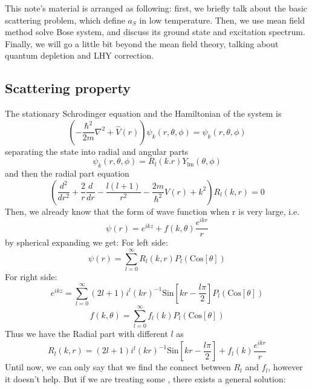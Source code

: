 This note's material is arranged as following: first, we briefly talk about the basic scattering problem, which define $a_S$ in low temperature.
Then, we use mean field method solve Bose system, and discuss its ground state and excitation spectrum. Finally, we will go a little bit beyond the mean field theory, talking about quantum depletion and LHY correction.

\subsection{Scattering property}
The stationary Schrodinger equation and the Hamiltonian of the system is
\begin{equation}
\left(-\frac{\hbar ^2}{2m}\nabla ^2+\hat{V}(r)\right)\psi _k(r,\theta ,\phi )=\psi _k(r,\theta ,\phi )
\end{equation}
separating the state into radial and angular parts
\begin{equation}
\psi _k(r,\theta ,\phi )=R_l(k.r)Y_{\text{lm}}(\theta,\phi)
\end{equation}
and then the radial part equation
\begin{equation}
\left(\frac{d^2}{dr^2}+\frac{2}{r}\frac{d}{dr}-\frac{l(l+1)}{r^2}-\frac{2m}{\hbar ^2}V(r)+k^2\right)R_l(k,r)=0
\end{equation}
Then, we already know that the form of wave function when r is very large, i.e.
\begin{equation}
\psi (r)=e^{i k z}+f(k,\theta )\frac{e^{i k r}}{r}
\end{equation}
by spherical expanding we get:
For left side:
\begin{equation}
\psi (r)=\sum _{l =0}^{\infty } R_l(k,r)P_l(\text{Cos}[\theta ])
\end{equation}
For right side:
\begin{equation}
e^{i k z}=\sum _{l=0}^{\infty}(2l+1)i^l(kr)^{-1}\text{Sin}\left[k r-\frac{l \pi }{2}\right]P_l(\text{Cos}[\theta])
\end{equation}
\begin{equation}
f(k,\theta )=\sum _{l =0}^{\infty } f_l(k)P_l(\text{Cos}[\theta ])
\end{equation}
Thus we have the Radial part with different $l$ as
\begin{equation}
R_l(k,r)=(2l+1)i^l(k r)^{-1}\text{Sin}\left[k r-\frac{l \pi }{2}\right]+f_l(k)\frac{e^{i k r}}{r}
\end{equation}
Until now, we can only say that we find the connect between $R_l$ and $f_l$, however it doesn't help. But if we are treating some , there exists a general solution:
